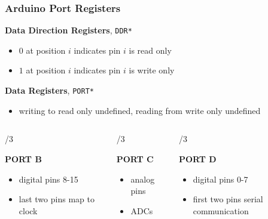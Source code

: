 \documentclass{beamer} \usetheme{Madrid}
\begin{document}
\begin{frame}
    \frametitle{Arduino Port Registers}
    \textbf{Data Direction Registers}, \texttt{DDR*}
    \begin{itemize}
        \item $0$ at position $i$ indicates pin $i$ is read only
        \item $1$ at position $i$ indicates pin $i$ is write only
    \end{itemize}
    \textbf{Data Registers}, \texttt{PORT*}
    \begin{itemize}
        \item writing to read only undefined, reading from write only undefined
    \end{itemize}
    \begin{columns}[t]
        \begin{column}{{\textwidth}/3}
            \begin{center}\textbf{PORT B}\end{center}
            \begin{itemize}
                \item digital pins 8-15
                \item last two pins map to clock
            \end{itemize}
        \end{column}
        \begin{column}{{\textwidth}/3}
            \begin{center}\textbf{PORT C}\end{center}
            \begin{itemize}
                \item analog pins
                \item ADCs
            \end{itemize}
        \end{column}
        \begin{column}{{\textwidth}/3}
            \begin{center}\textbf{PORT D}\end{center}
            \begin{itemize}
                \item digital pins 0-7
                \item first two pins serial communication
            \end{itemize}
        \end{column}
    \end{columns}
\end{frame}
\end{document}
